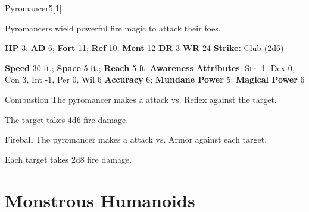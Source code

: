   \begin{monsection}{Pyromancer}{5}[1]
    \vspace{-1em}\vspace{-1em}
    \vspace{0em}

    
      Pyromancers wield powerful fire magic to attack their foes.
    

    \begin{spellcontent}
      \begin{spelltargetinginfo}
        \pari \textbf{HP} 3;
          \textbf{AD} 6;
          \textbf{Fort} 11;
          \textbf{Ref} 10;
          \textbf{Ment} 12
        \pari \textbf{DR} 3
        \pari \textbf{WR} 24
        \pari \textbf{Strike:}
            Club  (2d6)
      \end{spelltargetinginfo}
    \end{spellcontent}
    \begin{monsterfooter}
      \pari \textbf{Speed} 30 ft.;
        \textbf{Space} 5 ft.;
        \textbf{Reach} 5 ft.
      \pari \textbf{Awareness} 
      \pari \textbf{Attributes}:
        Str -1, Dex 0,
        Con 3, Int -1,
        Per 0, Wil 6
      \pari \textbf{Accuracy} 6;
        \textbf{Mundane Power} 5;
      \textbf{Magical Power} 6
    \end{monsterfooter}
  \end{monsection}
  \begin{freeability}{Combustion}
      The pyromancer makes a  attack
        vs. Reflex against the target.
    
    \hit The target takes 4d6 fire damage.
    \end{freeability}
  

    \begin{freeability}{Fireball}
      The pyromancer makes a  attack
        vs. Armor against each target.
    
    \hit Each target takes 2d8 fire damage.
    \end{freeability}
  
        \section{Monstrous Humanoids}
      

